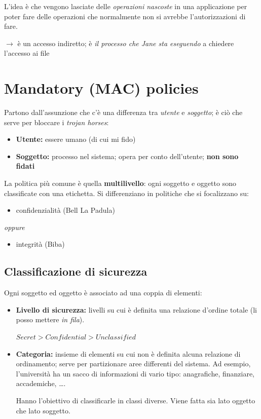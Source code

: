 \documentclass{report}
\begin{document}
\noindent L'idea è che vengono lasciate delle \textit{operazioni nascoste} in una applicazione per 
poter fare delle operazioni che normalmente non si avrebbe l'autorizzazioni di fare.

$\rightarrow$ è un accesso indiretto; è \textit{il processo che Jane sta eseguendo} a chiedere l'accesso ai file



\chapter{Mandatory (MAC) policies}
\noindent Partono dall'assunzione che c'è una differenza tra \textit{utente} e \textit{soggetto}; è ciò 
che serve per bloccare i \textit{trojan horses}:
\begin{itemize}
    \item \textbf{Utente:} essere umano (di cui mi fido)
    \item \textbf{Soggetto:} processo nel sistema; opera per conto dell'utente; \textbf{non sono fidati} 
\end{itemize}

\noindent La politica più comune è quella \textbf{multilivello}: ogni soggetto e 
oggetto sono classificate con una etichetta. Si differenziano in politiche che si focalizzano su:
\begin{itemize}
    \item confidenzialità (Bell La Padula)
\end{itemize}

\textit{oppure}

\begin{itemize}
    \item integrità (Biba)
\end{itemize}

\section{Classificazione di sicurezza}
Ogni soggetto ed oggetto è associato ad una coppia di elementi:
\begin{itemize}
    \item \textbf{Livello di sicurezza:} livelli su cui è definita una relazione d'ordine totale (li posso mettere \textit{in fila}).
    \begin{center}
        $Secret > Confidential > Unclassified$
    \end{center}
    \item \textbf{Categoria:} insieme di elementi su cui non è definita alcuna relazione di ordinamento; serve 
    per partizionare aree differenti del sistema. Ad esempio, l'università ha un sacco di informazioni di vario 
    tipo: anagrafiche, finanziare, accademiche, \dots. 
    
    \noindent Hanno l'obiettivo di classificarle in classi diverse. Viene fatta 
    sia lato oggetto che lato soggetto.
\end{itemize}
\end{document}
